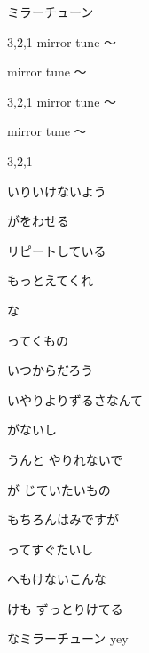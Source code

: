 \documentclass[a4paper,tate,twocolumn,12pt]{ltjtarticle}
\begin{document}
\thispagestyle{empty}

\begin{center}
{\LARGE ミラーチューン}
\end{center}

\vspace{1em}

\begin{flushleft}

\noindent\begin{minipage}{\linewidth}
3,2,1 mirror tune 〜

mirror tune 〜

3,2,1 mirror tune 〜

mirror tune 〜

3,2,1
\end{minipage}

\vspace{2em}

\noindent\begin{minipage}{\linewidth}
いりいけないよう

がをわせる

リピートしている

もっとえてくれ

な

ってくもの

いつからだろう

いやりよりずるさなんて

がないし

うんと やりれないで

が じていたいもの
\end{minipage}

\vspace{2em}

\noindent\begin{minipage}{\linewidth}
もちろんはみですが

ってすぐたいし

へもけないこんな

けも ずっとりけてる

なミラーチューン yey
\end{minipage}


\end{flushleft}
\end{document}
